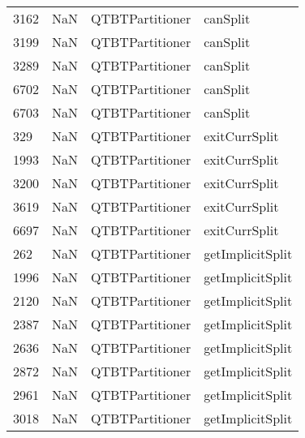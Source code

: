 \begin{tabular}{llll}
3162 &                   NaN &            QTBTPartitioner &                                  canSplit \\
3199 &                   NaN &            QTBTPartitioner &                                  canSplit \\
3289 &                   NaN &            QTBTPartitioner &                                  canSplit \\
6702 &                   NaN &            QTBTPartitioner &                                  canSplit \\
6703 &                   NaN &            QTBTPartitioner &                                  canSplit \\
329  &                   NaN &            QTBTPartitioner &                             exitCurrSplit \\
1993 &                   NaN &            QTBTPartitioner &                             exitCurrSplit \\
3200 &                   NaN &            QTBTPartitioner &                             exitCurrSplit \\
3619 &                   NaN &            QTBTPartitioner &                             exitCurrSplit \\
6697 &                   NaN &            QTBTPartitioner &                             exitCurrSplit \\
262  &                   NaN &            QTBTPartitioner &                          getImplicitSplit \\
1996 &                   NaN &            QTBTPartitioner &                          getImplicitSplit \\
2120 &                   NaN &            QTBTPartitioner &                          getImplicitSplit \\
2387 &                   NaN &            QTBTPartitioner &                          getImplicitSplit \\
2636 &                   NaN &            QTBTPartitioner &                          getImplicitSplit \\
2872 &                   NaN &            QTBTPartitioner &                          getImplicitSplit \\
2961 &                   NaN &            QTBTPartitioner &                          getImplicitSplit \\
3018 &                   NaN &            QTBTPartitioner &                          getImplicitSplit \\

\end{tabular}
